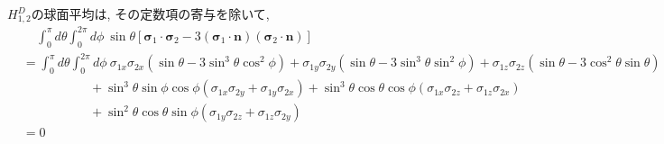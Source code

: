 \begin{ex}
    \label{ex7.34}
\end{ex}
\begin{ex}
    \label{ex7.35}
    $H_{1,2}^D$の球面平均は, その定数項の寄与を除いて,
    \begin{align*}
         & \ \ \ \ \
        \int_0^\pi d \theta \int_0^{2 \pi} d \phi
        \ \sin\theta
        \left[
            \bm{\sigma}_1 \cdot \bm{\sigma}_2
            -
            3
            \left( \bm{\sigma}_1 \cdot \bm{n}\right)
            \left(  \bm{\sigma}_2 \cdot \bm{n}\right)
            \right]                                        \\
         & =
        \int_0^\pi d \theta \int_0^{2 \pi} d \phi \
        \sigma_{1x}\sigma_{2x}
        \left( \sin\theta - 3 \sin^3\theta \cos^2\phi\right)
        +
        \sigma_{1y}\sigma_{2y}
        \left( \sin\theta - 3 \sin^3\theta \sin^2\phi\right)
        +
        \sigma_{1z}\sigma_{2z}
        \left( \sin\theta - 3 \cos^2\theta \sin\theta\right)
        \\
         & \ \ \ \ \ \ \ \ \ \ \ \ \ \ \ \ \ \ \ \ \ \ \ \
        +\sin^3\theta \sin\phi \cos\phi
        \left( \sigma_{1x} \sigma_{2y} + \sigma_{1y}\sigma_{2x}\right)
        +
        \sin^3\theta \cos\theta \cos\phi
        \left( \sigma_{1x} \sigma_{2z} + \sigma_{1z}\sigma_{2x}\right)
        \\
         & \ \ \ \ \ \ \ \ \ \ \ \ \ \ \ \ \ \ \ \ \ \ \ \
        +
        \sin^2\theta \cos\theta \sin\phi
        \left( \sigma_{1y} \sigma_{2z} + \sigma_{1z}\sigma_{2y}\right)
        \\&=0
    \end{align*}
\end{ex}

